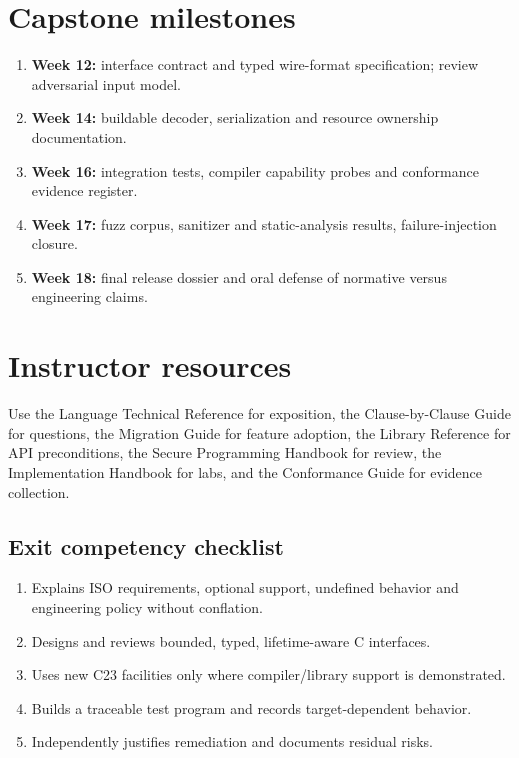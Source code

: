 \documentclass[10pt,letterpaper,oneside]{report}
\begin{document}
\chapter{Capstone milestones}
\begin{enumerate}
\item \textbf{Week 12:} interface contract and typed wire-format specification; review adversarial input model.
\item \textbf{Week 14:} buildable decoder, serialization and resource ownership documentation.
\item \textbf{Week 16:} integration tests, compiler capability probes and conformance evidence register.
\item \textbf{Week 17:} fuzz corpus, sanitizer and static-analysis results, failure-injection closure.
\item \textbf{Week 18:} final release dossier and oral defense of normative versus engineering claims.
\end{enumerate}
\chapter{Instructor resources}
Use the Language Technical Reference for exposition, the Clause-by-Clause Guide for questions, the Migration Guide for feature adoption, the Library Reference for API preconditions, the Secure Programming Handbook for review, the Implementation Handbook for labs, and the Conformance Guide for evidence collection.
\section{Exit competency checklist}
\begin{enumerate}
\item Explains ISO requirements, optional support, undefined behavior and engineering policy without conflation.
\item Designs and reviews bounded, typed, lifetime-aware C interfaces.
\item Uses new C23 facilities only where compiler/library support is demonstrated.
\item Builds a traceable test program and records target-dependent behavior.
\item Independently justifies remediation and documents residual risks.
\end{enumerate}
\end{document}

